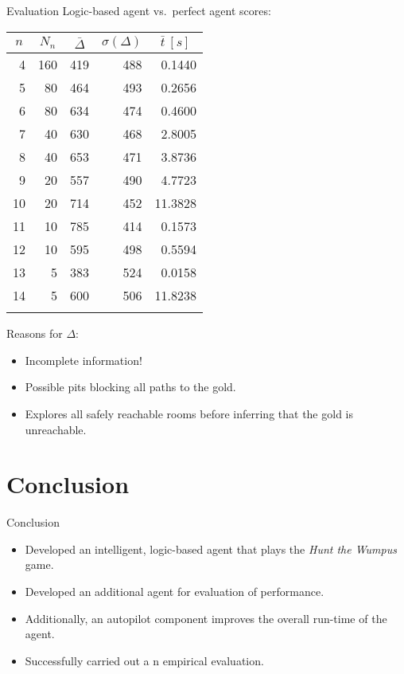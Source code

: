 \documentclass[smaller,dvipsnames,ratio=169,10pt]{beamer}
\newcommand{\htw}{\emph{Hunt the Wumpus}\xspace}
\begin{document}
  \begin{frame}[allowframebreaks]{Evaluation}
  	Logic-based agent vs.\ perfect agent scores:
  	\begin{center}
      	\begin{tabular}{rrrrr}
      		\toprule
      		\multicolumn{1}{c}{$n$} & \multicolumn{1}{c}{$N_n$} & \multicolumn{1}{c}{$\bar{\Delta}$} & \multicolumn{1}{c}{$\sigma(\Delta)$} & \multicolumn{1}{c}{$\bar{t} \: [s]$}\\
      		\midrule
      		4 & 160	& 419 & 488 & 0.1440 \\
      		5 & 80  & 464 & 493 & 0.2656 \\
      		6 & 80  & 634 & 474 & 0.4600 \\
      		7 & 40  & 630 & 468 & 2.8005 \\
      		8 & 40  & 653 & 471 & 3.8736 \\
      		9 & 20  & 557 & 490 & 4.7723 \\
      		10 & 20 & 714 & 452 & 11.3828 \\
      		11 & 10 & 785 & 414 & 0.1573 \\
      		12 & 10 & 595 & 498 & 0.5594 \\
      		13 & 5  & 383 & 524 & 0.0158 \\
      		14 & 5  & 600 & 506 & 11.8238 \\
      		\bottomrule\\
      	\end{tabular}
	\end{center}      
      
      \framebreak
      
      Reasons for $\Delta$: 
      \begin{itemize}
        \item Incomplete information!
        \item Possible pits blocking all paths to the gold.
        \item Explores all safely reachable rooms before inferring that the gold is unreachable.
      \end{itemize}
	\end{frame}

  \section{Conclusion}

  \begin{frame}{Conclusion}
  	\begin{itemize}
  		\item Developed an intelligent, logic-based agent that plays the \htw game. 
  		\item Developed an additional agent for evaluation of performance.
  		\item  Additionally, an autopilot component improves the overall run-time of the agent. 
  		\item Successfully carried out a	n empirical evaluation. 
  	\end{itemize}
    
  \end{frame}
\end{document}
